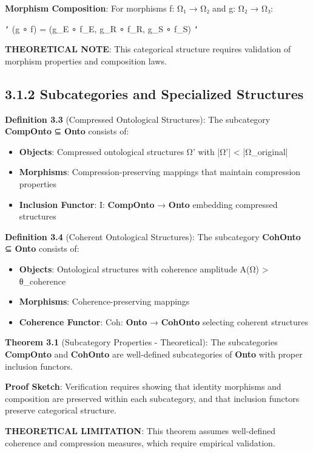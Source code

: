 \textbf{Morphism Composition}: For morphisms f: Ω₁ → Ω₂ and g: Ω₂ → Ω₃:

\texttt{`}
(g ∘ f) = (g_E ∘ f_E, g_R ∘ f_R, g_S ∘ f_S)
\texttt{`}

\textbf{THEORETICAL NOTE}: This categorical structure requires validation of morphism properties and composition laws.

\subsection{3.1.2 Subcategories and Specialized Structures}

\textbf{Definition 3.3} (Compressed Ontological Structures): The subcategory \textbf{CompOnto} ⊆ \textbf{Onto} consists of:

\begin{itemize}
\item \textbf{Objects}: Compressed ontological structures Ω' with |Ω'| < |Ω_original|
\item \textbf{Morphisms}: Compression-preserving mappings that maintain compression properties
\item \textbf{Inclusion Functor}: I: \textbf{CompOnto} → \textbf{Onto} embedding compressed structures
\end{itemize}

\textbf{Definition 3.4} (Coherent Ontological Structures): The subcategory \textbf{CohOnto} ⊆ \textbf{Onto} consists of:

\begin{itemize}
\item \textbf{Objects}: Ontological structures with coherence amplitude A(Ω) > θ_coherence
\item \textbf{Morphisms}: Coherence-preserving mappings
\item \textbf{Coherence Functor}: Coh: \textbf{Onto} → \textbf{CohOnto} selecting coherent structures
\end{itemize}

\textbf{Theorem 3.1} (Subcategory Properties - Theoretical): The subcategories \textbf{CompOnto} and \textbf{CohOnto} are well-defined subcategories of \textbf{Onto} with proper inclusion functors.

\textbf{Proof Sketch}: Verification requires showing that identity morphisms and composition are preserved within each subcategory, and that inclusion functors preserve categorical structure.

\textbf{THEORETICAL LIMITATION}: This theorem assumes well-defined coherence and compression measures, which require empirical validation.

